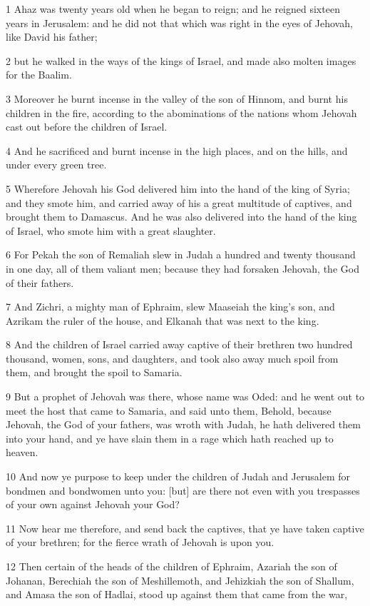 \par 1 Ahaz was twenty years old when he began to reign; and he reigned sixteen years in Jerusalem: and he did not that which was right in the eyes of Jehovah, like David his father;
\par 2 but he walked in the ways of the kings of Israel, and made also molten images for the Baalim.
\par 3 Moreover he burnt incense in the valley of the son of Hinnom, and burnt his children in the fire, according to the abominations of the nations whom Jehovah cast out before the children of Israel.
\par 4 And he sacrificed and burnt incense in the high places, and on the hills, and under every green tree.
\par 5 Wherefore Jehovah his God delivered him into the hand of the king of Syria; and they smote him, and carried away of his a great multitude of captives, and brought them to Damascus. And he was also delivered into the hand of the king of Israel, who smote him with a great slaughter.
\par 6 For Pekah the son of Remaliah slew in Judah a hundred and twenty thousand in one day, all of them valiant men; because they had forsaken Jehovah, the God of their fathers.
\par 7 And Zichri, a mighty man of Ephraim, slew Maaseiah the king's son, and Azrikam the ruler of the house, and Elkanah that was next to the king.
\par 8 And the children of Israel carried away captive of their brethren two hundred thousand, women, sons, and daughters, and took also away much spoil from them, and brought the spoil to Samaria.
\par 9 But a prophet of Jehovah was there, whose name was Oded: and he went out to meet the host that came to Samaria, and said unto them, Behold, because Jehovah, the God of your fathers, was wroth with Judah, he hath delivered them into your hand, and ye have slain them in a rage which hath reached up to heaven.
\par 10 And now ye purpose to keep under the children of Judah and Jerusalem for bondmen and bondwomen unto you: [but] are there not even with you trespasses of your own against Jehovah your God?
\par 11 Now hear me therefore, and send back the captives, that ye have taken captive of your brethren; for the fierce wrath of Jehovah is upon you.
\par 12 Then certain of the heads of the children of Ephraim, Azariah the son of Johanan, Berechiah the son of Meshillemoth, and Jehizkiah the son of Shallum, and Amasa the son of Hadlai, stood up against them that came from the war,
